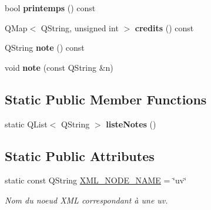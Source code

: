 \begin{DoxyCompactItemize}
\item 
\hypertarget{classUVEtudiant_a1cb9fee2119f5ac89cc0871929907f14}{bool {\bfseries printemps} () const }\label{classUVEtudiant_a1cb9fee2119f5ac89cc0871929907f14}

\item 
\hypertarget{classUVEtudiant_aa9e6688f67df51ddac6822d6181eb2c8}{Q\+Map$<$ Q\+String, unsigned int $>$ {\bfseries credits} () const }\label{classUVEtudiant_aa9e6688f67df51ddac6822d6181eb2c8}

\item 
\hypertarget{classUVEtudiant_ac04557b040457e811b3d29d8c412651c}{Q\+String {\bfseries note} () const }\label{classUVEtudiant_ac04557b040457e811b3d29d8c412651c}

\item 
\hypertarget{classUVEtudiant_a592fdb389dc7b53a26fe647a9802eea2}{void {\bfseries note} (const Q\+String \&n)}\label{classUVEtudiant_a592fdb389dc7b53a26fe647a9802eea2}

\end{DoxyCompactItemize}
\subsection*{Static Public Member Functions}
\begin{DoxyCompactItemize}
\item 
\hypertarget{classUVEtudiant_a65ad7b8c17cc2f86fdbc2410ec9f9c3d}{static Q\+List$<$ Q\+String $>$ {\bfseries liste\+Notes} ()}\label{classUVEtudiant_a65ad7b8c17cc2f86fdbc2410ec9f9c3d}

\end{DoxyCompactItemize}
\subsection*{Static Public Attributes}
\begin{DoxyCompactItemize}
\item 
\hypertarget{classUVEtudiant_aceb9273c412c32a5a95156974c1c83eb}{static const Q\+String \hyperlink{classUVEtudiant_aceb9273c412c32a5a95156974c1c83eb}{X\+M\+L\+\_\+\+N\+O\+D\+E\+\_\+\+N\+A\+M\+E} = \char`\"{}uv\char`\"{}}\label{classUVEtudiant_aceb9273c412c32a5a95156974c1c83eb}

\begin{DoxyCompactList}\small\item\em Nom du noeud X\+M\+L correspondant à une uv. \end{DoxyCompactList}\end{DoxyCompactItemize}


